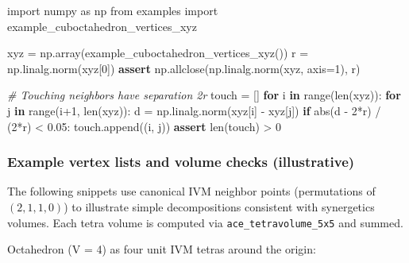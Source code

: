 \documentclass[
]{article}
\newenvironment{Shaded}{}{}
\newcommand{\BuiltInTok}[1]{#1}
\newcommand{\CommentTok}[1]{\textcolor[rgb]{0.38,0.63,0.69}{\textit{#1}}}
\newcommand{\ControlFlowTok}[1]{\textcolor[rgb]{0.00,0.44,0.13}{\textbf{#1}}}
\newcommand{\DecValTok}[1]{\textcolor[rgb]{0.25,0.63,0.44}{#1}}
\newcommand{\FloatTok}[1]{\textcolor[rgb]{0.25,0.63,0.44}{#1}}
\newcommand{\ImportTok}[1]{#1}
\newcommand{\KeywordTok}[1]{\textcolor[rgb]{0.00,0.44,0.13}{\textbf{#1}}}
\newcommand{\NormalTok}[1]{#1}
\newcommand{\OperatorTok}[1]{\textcolor[rgb]{0.40,0.40,0.40}{#1}}
\begin{document}
\begin{Shaded}
\begin{Highlighting}[]
\ImportTok{import}\NormalTok{ numpy }\ImportTok{as}\NormalTok{ np}
\ImportTok{from}\NormalTok{ examples }\ImportTok{import}\NormalTok{ example\_cuboctahedron\_vertices\_xyz}

\NormalTok{xyz }\OperatorTok{=}\NormalTok{ np.array(example\_cuboctahedron\_vertices\_xyz())}
\NormalTok{r }\OperatorTok{=}\NormalTok{ np.linalg.norm(xyz[}\DecValTok{0}\NormalTok{])}
\ControlFlowTok{assert}\NormalTok{ np.allclose(np.linalg.norm(xyz, axis}\OperatorTok{=}\DecValTok{1}\NormalTok{), r)}

\CommentTok{\# Touching neighbors have separation 2r}
\NormalTok{touch }\OperatorTok{=}\NormalTok{ []}
\ControlFlowTok{for}\NormalTok{ i }\KeywordTok{in} \BuiltInTok{range}\NormalTok{(}\BuiltInTok{len}\NormalTok{(xyz)):}
    \ControlFlowTok{for}\NormalTok{ j }\KeywordTok{in} \BuiltInTok{range}\NormalTok{(i}\OperatorTok{+}\DecValTok{1}\NormalTok{, }\BuiltInTok{len}\NormalTok{(xyz)):}
\NormalTok{        d }\OperatorTok{=}\NormalTok{ np.linalg.norm(xyz[i] }\OperatorTok{{-}}\NormalTok{ xyz[j])}
        \ControlFlowTok{if} \BuiltInTok{abs}\NormalTok{(d }\OperatorTok{{-}} \DecValTok{2}\OperatorTok{*}\NormalTok{r) }\OperatorTok{/}\NormalTok{ (}\DecValTok{2}\OperatorTok{*}\NormalTok{r) }\OperatorTok{\textless{}} \FloatTok{0.05}\NormalTok{:}
\NormalTok{            touch.append((i, j))}
\ControlFlowTok{assert} \BuiltInTok{len}\NormalTok{(touch) }\OperatorTok{\textgreater{}} \DecValTok{0}
\end{Highlighting}
\end{Shaded}

\hypertarget{example-vertex-lists-and-volume-checks-illustrative}{%
\subsubsection{Example vertex lists and volume checks
(illustrative)}\label{example-vertex-lists-and-volume-checks-illustrative}}

The following snippets use canonical IVM neighbor points (permutations
of \((2,1,1,0)\)) to illustrate simple decompositions consistent with
synergetics volumes. Each tetra volume is computed via
\texttt{ace\_tetravolume\_5x5} and summed.

Octahedron (V = 4) as four unit IVM tetras around the origin:
\end{document}
